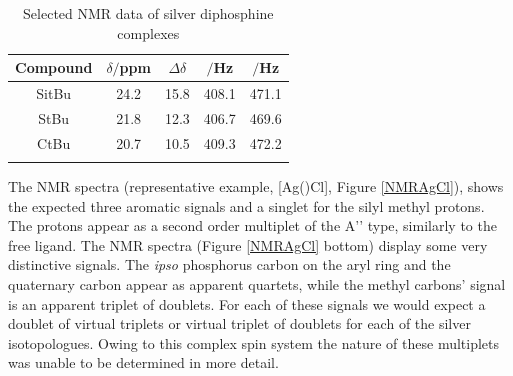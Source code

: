 \begin{table}[htbp]
\caption[Selected NMR data of silver diphosphine complexes]{Selected NMR data of silver diphosphine complexes} 
\vspace{1em}
\label{table:silverchlorides}
\small
\begin{center}
\begin{tabular}{ c c c c c}
	\toprule{}
	\bfseries{Compound}&\bfseries{$\delta$\phosphorus{}$/$ppm}&\bfseries{$\Delta\delta$}&\bfseries{\JAgPseven{}$/$Hz}&\bfseries{\JAgPnine{}$/$Hz}\\
	\midrule{}
	SitBu	&	24.2	&	15.8	&	408.1	&	471.1\\
	StBu		& 	21.8	&	12.3	&	406.7	&	469.6\\
	CtBu		&	20.7	&	10.5	&	409.3	&	472.2\\
	\bottomrule{}
\end{tabular}
\end{center}
\end{table}

The \proton{} NMR spectra (representative example, [Ag(\tBusixantphos)Cl], Figure \ref{NMRAgCl}), shows the expected three aromatic signals and a singlet for the silyl methyl protons.  The \tBu{} protons appear as a second order multiplet of the A'' type, similarly to the free ligand.  The \carbon{} NMR spectra (Figure \ref{NMRAgCl} bottom) display some very distinctive signals.  The \emph{ipso} phosphorus carbon on the aryl ring and the quaternary \tBu{} carbon appear as apparent quartets, while the methyl \tBu{} carbons' signal is an apparent triplet of doublets.  For each of these signals we would expect a doublet of virtual triplets or virtual triplet of doublets for each of the silver isotopologues.  Owing to this complex spin system the nature of these multiplets was unable to be determined in more detail.  



